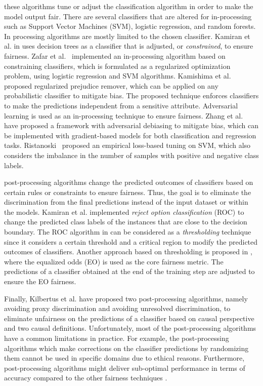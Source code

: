 these algorithms tune or adjust the classification algorithm in order to make the model output fair. There are several classifiers that are altered for in-processing such as Support Vector Machines (SVM), logistic regression, and random forests. In processing algorithms are mostly limited to the chosen classifier. Kamiran et al.  in \cite{kamiran2010decision-tree} uses decision trees as a classifier that is  adjusted, or \emph{constrained}, to ensure fairness.
Zafar et al.~\cite{zafar2017fairness-cons} implemented an in-processing algorithm based on constraining classifiers, which is formulated as a regularized optimization problem, using logistic regression and SVM algorithms. Kamishima et al.~\cite{kamishima2011fairness} proposed regularized prejudice remover, which can be applied on any probabilistic classifier to mitigate bias. The proposed technique enforces classifiers to make the predictions independent from a sensitive attribute. 
Adversarial learning is used as an in-processing technique to ensure fairness. 
Zhang et al. \cite{zhang2018adversarial} have proposed a framework with adversarial debiasing to mitigate bias, which can be implemented with gradient-based models for both classification and regression tasks. 
Ristanoski~\cite{ristanoski2013discr-aware} proposed an empirical loss-based tuning on SVM, which also considers the imbalance in the number of samples with positive and negative class labels. 


post-processing algorithms change the predicted outcomes of classifiers based on certain rules or constraints to ensure fairness. Thus, the goal is to eliminate the discrimination from the final predictions instead of the input dataset or within the models. Kamiran et al. \cite{kamiran2012ROC} implemented \emph{reject option classification} (ROC) to change the predicted class labels of the instances that are close to the decision boundary. 
The ROC algorithm in \cite{kamiran2012ROC} can be considered as a \emph{thresholding} technique since it considers a certain threshold and a critical region to modify the predicted outcomes of classifiers.
Another approach based on thresholding is proposed in \cite{hardt2016equal_odds_opport}, where the equalized odds (EO) is used as the core fairness metric. The predictions of a classifier obtained at the end of the training step are adjusted to ensure the EO fairness. 


Finally, Kilbertus et al. \cite{kilbertus2017avoiding_discr} have proposed two post-processing algorithms, namely avoiding proxy discrimination and avoiding unresolved discrimination, to eliminate unfairness on the predictions of a classifier based on causal perspective and two causal definitions. 
Unfortunately, most of the post-processing algorithms have a common limitations in practice. For example, the post-processing algorithms which make corrections on the classifier predictions by randomizing them cannot be used in specific domains due to ethical reasons. Furthermore, post-processing algorithms might deliver sub-optimal performance in terms of accuracy compared to the other fairness techniques \cite{woodworth2017post-learning}. 



